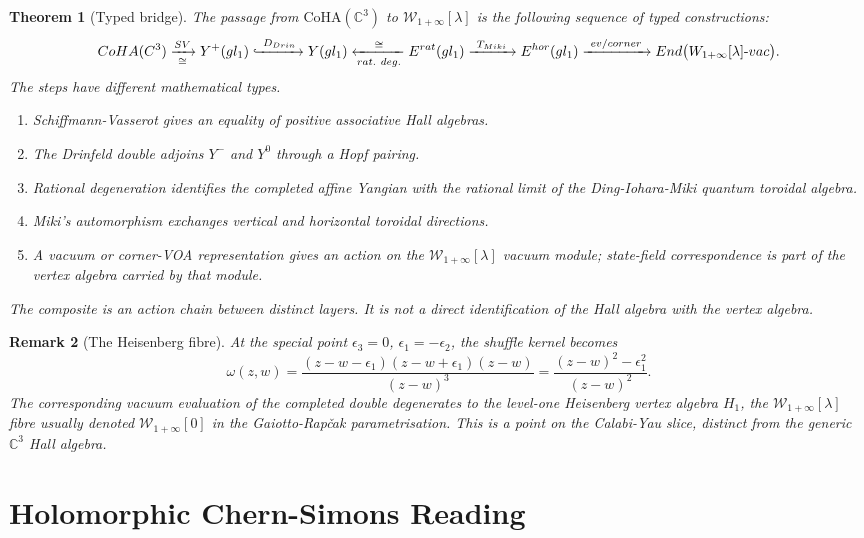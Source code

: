 \documentclass[11pt]{article}
\newtheorem{theorem}{Theorem}[section]
\newtheorem{remark}[theorem]{Remark}
\providecommand{\CoHA}{\mathrm{CoHA}}
\providecommand{\gglone}{\widehat{\mathfrak{gl}}_{1}}
\providecommand{\Yp}{Y^{+}}
\providecommand{\Ym}{Y^{-}}
\providecommand{\Yz}{Y^{0}}
\providecommand{\YFull}{Y}
\providecommand{\Wilpha}{\mathcal{W}_{1+\infty}}
\providecommand{\Ecal}{\mathcal{E}}
\providecommand{\End}{\mathrm{End}}
\begin{document}
\begin{theorem}[Typed bridge]
\label{thm:typed-bridge}
The passage from $\CoHA(\mathbb{C}^3)$ to $\Wilpha[\lambda]$ is the
following sequence of typed constructions:
\[
\CoHA(\mathbb{C}^3)
\xrightarrow[\cong]{\mathrm{SV}}
\Yp(\gglone)
\xhookrightarrow{\ D_{\mathrm{Drin}}\ }
\YFull(\gglone)
\xleftarrow[\mathrm{rat.\ deg.}]{\cong}
\Ecal^{\mathrm{rat}}(\gglone)
\xrightarrow{\ T_{\mathrm{Miki}}\ }
\Ecal^{\mathrm{hor}}(\gglone)
\xrightarrow{\ \mathrm{ev/corner}\ }
\End\bigl(\Wilpha[\lambda]\text{-}\mathrm{vac}\bigr).
\]
The steps have different mathematical types.
\begin{enumerate}
\item Schiffmann-Vasserot gives an equality of positive associative Hall
algebras.
\item The Drinfeld double adjoins $\Ym$ and $\Yz$ through a Hopf pairing.
\item Rational degeneration identifies the completed affine Yangian
with the rational limit of the Ding-Iohara-Miki quantum toroidal
algebra.
\item Miki's automorphism exchanges vertical and horizontal toroidal
directions.
\item A vacuum or corner-VOA representation gives an action on the
$\Wilpha[\lambda]$ vacuum module; state-field correspondence is part of
the vertex algebra carried by that module.
\end{enumerate}
The composite is an action chain between distinct layers. It is not a
direct identification of the Hall algebra with the vertex algebra.
\end{theorem}

\begin{remark}[The Heisenberg fibre]
\label{rem:heisenberg-fibre}
At the special point $\epsilon_3=0$, $\epsilon_1=-\epsilon_2$, the
shuffle kernel becomes
\[
\omega(z,w)
=\frac{(z-w-\epsilon_1)(z-w+\epsilon_1)(z-w)}{(z-w)^3}
=\frac{(z-w)^2-\epsilon_1^2}{(z-w)^2}.
\]
The corresponding vacuum evaluation of the completed double degenerates
to the level-one Heisenberg vertex algebra $H_1$, the
$\Wilpha[\lambda]$ fibre usually denoted $\Wilpha[0]$ in the
Gaiotto-Rap\v{c}ak parametrisation. This is a point on the
Calabi-Yau slice, distinct from the generic $\mathbb{C}^3$ Hall
algebra.
\end{remark}

\section{Holomorphic Chern-Simons Reading}
\end{document}
